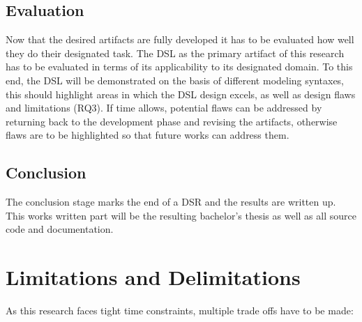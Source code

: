 \documentclass[10pt,a4paper,oneside]{scrartcl}
\newcommand\hint[2]{
\ifthenelse{\boolean{showhints}}{
\begin{center}
\colorbox{black!10}{
\begin{minipage}{.963\textwidth}
#2\hfill\textbf{#1}
\end{minipage}
}\end{center}}{}
}
\begin{document}
\subsection{Evaluation}
Now that the desired artifacts are fully developed it has to be evaluated how well they do their designated task. The DSL as the primary artifact of this research has to be evaluated in terms of its applicability to its designated domain. To this end, the DSL will be demonstrated on the basis of different modeling syntaxes, this should highlight areas in which the DSL design excels, as well as design flaws and limitations (RQ3). If time allows, potential flaws can be addressed by returning back to the development phase and revising the artifacts, otherwise flaws are to be highlighted so that future works can address them.

\subsection{Conclusion}
The conclusion stage marks the end of a DSR and the results are written up. This works written part will be the resulting bachelor's thesis as well as all source code and documentation.



\section{Limitations and Delimitations}



As this research faces tight time constraints, multiple trade offs have to be made:
\end{document}
